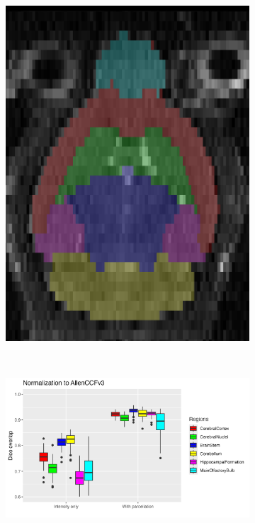 \documentclass[
  12pt,
]{article}
\begin{document}
\begin{figure}
\begin{subfigure}{0.25\textwidth}
  \includegraphics[width=\linewidth]{Figures/NR5_M_Day0_slice53.png}
  \caption{}
  \label{fig:subp_b}
\end{subfigure} \\
\begin{subfigure}{.75\textwidth}
  \centering
  \includegraphics[width=\linewidth]{Figures/diceAllenCCFv3.png}

\end{subfigure}
\end{figure}
\end{document}
